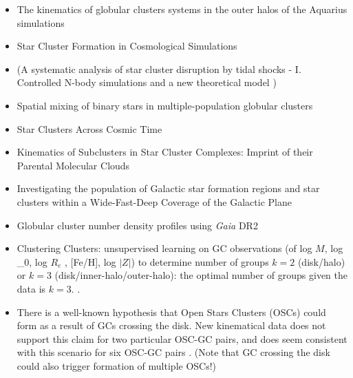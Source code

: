 \documentclass[a4paper,fleqn,usenatbib]{mnras}
\begin{document}
\begin{itemize}
\item The kinematics of globular clusters systems in the outer halos of the Aquarius simulations \citep{2016A&A...592A..55V}
\item Star Cluster Formation in Cosmological Simulations \citep{2017ApJ...834...69L, 2018ApJ...861..107L, 2018arXiv181011036L}
\item (A systematic analysis of star cluster disruption by tidal shocks - I. Controlled N-body simulations and a new theoretical model \citep{2018arXiv181200014W})
\item Spatial mixing of binary stars in multiple-population globular clusters \citep{2018MNRAS.tmp.3147H}
\item Star Clusters Across Cosmic Time \citep{2018arXiv181201615K}
\item Kinematics of Subclusters in Star Cluster Complexes: Imprint of their Parental Molecular Clouds \citep{2018arXiv181201858F}
\item Investigating the population of Galactic star formation regions and star clusters within a Wide-Fast-Deep Coverage of the Galactic Plane  \citep{2018arXiv181203025P}
\item Globular cluster number density profiles using \textit{Gaia} DR2 \citep{2019arXiv190108072D}
\item Clustering Clusters: unsupervised learning on GC observations (of log $M$,
    log \sigma_0, log $R_e$ , [Fe/H], log $|Z|$) to determine number of groups
    $k=2$ (disk/halo) or $k=3$ (disk/inner-halo/outer-halo): the optimal number
    of groups given the data is $k=3$. \citep{2019arXiv190105354P}.
\item There is a well-known hypothesis that Open Stars Clusters (OSCs) could form as a result
    of GCs crossing the disk. New kinematical data does not support
    this claim for two particular OSC-GC pairs, and does seem consistent
    with this scenario for six OSC-GC pairs \citep{2019arXiv190106481B}. (Note
    that GC crossing the disk could also trigger formation of multiple OSCs!)
\end{itemize}
 
 
\end{document}

